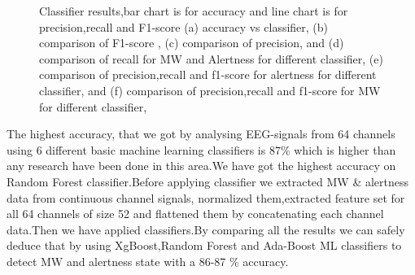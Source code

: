 \begin{figure}
    \centering
    \caption{Classifier results,bar chart is for accuracy and line chart is for precision,recall and F1-score (a) accuracy vs classifier, (b) comparison of F1-score , (c) comparison of precision, and (d) comparison of recall  for MW and Alertness for different classifier,  (e) comparison of precision,recall and f1-score for alertness for different classifier, and (f)  comparison of precision,recall and f1-score for MW for different classifier,  }
    \label{fig:test_score}
\end{figure}


The highest accuracy, that we got by analysing EEG-signals from 64 channels using 6 different basic machine learning  classifiers is 87\% which is higher than any research have been done in this area.We have got the highest accuracy on Random Forest classifier.Before applying classifier we extracted MW \& alertness data from continuous channel signals, normalized them,extracted feature set for all 64 channels of size 52 and flattened them by concatenating each channel data.Then we have applied classifiers.By comparing all the results we can safely deduce that by using XgBoost,Random Forest and Ada-Boost ML classifiers to detect MW and alertness state with a 86-87 \% accuracy.